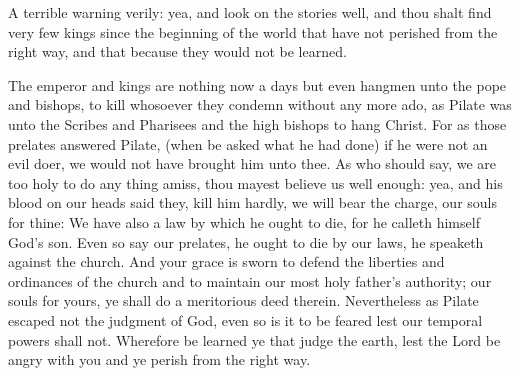 A terrible warning verily: yea, and look on the stories 
well, and thou shalt find very few kings since the beginning 
of the world that have not perished from the right way, and 
that because they would not be learned. 

The emperor and kings are nothing now a days but even 
hangmen unto the pope and bishops, to kill whosoever 
they condemn without any more ado, as Pilate was unto the 
Scribes and Pharisees and the high bishops to hang Christ. 
For as those prelates answered Pilate, (when be asked 
what he had done) if he were not an evil doer, we would 
not have brought him unto thee. As who should say, we 
are too holy to do any thing amiss, thou mayest believe us 
well enough: yea, and his blood on our heads said they, kill 
him hardly, we will bear the charge, our souls for thine: 
We have also a law by which he ought to die, for he calleth 
himself God's son. Even so say our prelates, he ought to 
die by our laws, he speaketh against the church. And 
your grace is sworn to defend the liberties and ordinances 
of the church and to maintain our most holy father's authority;
our souls for yours, ye shall do a meritorious deed 
therein. Nevertheless as Pilate escaped not the judgment of 
God, even so is it to be feared lest our temporal powers shall 
not. Wherefore be learned ye that judge the earth, lest the 
Lord be angry with you and ye perish from the right way. 

